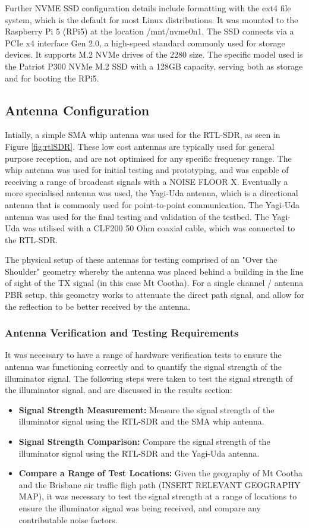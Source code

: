 Further NVME SSD configuration details include formatting with the ext4 file system, which is the default for most Linux distributions. It was mounted to the Raspberry Pi 5 (RPi5) at the location /mnt/nvme0n1. The SSD connects via a PCIe x4 interface Gen 2.0, a high-speed standard commonly used for storage devices. It supports M.2 NVMe drives of the 2280 size. The specific model used is the Patriot P300 NVMe M.2 SSD with a 128GB capacity, serving both as storage and for booting the RPi5.


\subsection{Antenna Configuration \label{sec:antenna}}
Intially, a simple SMA whip antenna was used for the RTL-SDR, as seen in Figure \ref{fig:rtlSDR}. These low cost antennas are typically used for general purpose reception, and are not optimised for any specific frequency range. The whip antenna was used for initial testing and prototyping, and was capable of receiving a range of broadcast signals with a NOISE FLOOR X. Eventually a more specialised antenna was used, the Yagi-Uda antenna, which is a directional antenna that is commonly used for point-to-point communication. The Yagi-Uda antenna was used for the final testing and validation of the testbed. The Yagi-Uda was utilised with a CLF200 50 Ohm coaxial cable, which was connected to the RTL-SDR. 

The physical setup of these antennas for testing comprised of an "Over the Shoulder" geometry whereby the antenna was placed behind a building in the line of sight of the TX signal (in this case Mt Cootha). For a single channel / antenna PBR setup, this geometry works to attenuate the direct path signal, and allow for the reflection to be better received by the antenna. 

\subsubsection{Antenna Verification and Testing Requirements}
It was necessary to have a range of hardware verification tests to ensure the antenna was functioning correctly and to quantify the signal strength of the illuminator signal. The following steps were taken to test the signal strength of the illuminator signal, and are discussed in the results section:
\begin{itemize}
    \item \textbf{Signal Strength Measurement:} Measure the signal strength of the illuminator signal using the RTL-SDR and the SMA whip antenna.
    \item \textbf{Signal Strength Comparison:} Compare the signal strength of the illuminator signal using the RTL-SDR and the Yagi-Uda antenna.
    \item \textbf{Compare a Range of Test Locations:} Given the geography of Mt Cootha and the Brisbane air traffic fligh path (INSERT RELEVANT GEOGRAPHY MAP), it was necessary to test the signal strength at a range of locations to ensure the illuminator signal was being received, and compare any contributable noise factors.
\end{itemize}


